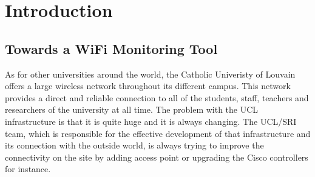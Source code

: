
\chapter{Introduction} %

\label{Chapter1} %




\section{Towards a WiFi Monitoring Tool}
As for other universities around the world, the Catholic Univeristy of Louvain offers a large wireless network throughout its different campus. This network provides a direct and reliable connection to all of the students, staff, teachers and researchers of the university at all time. The problem with the UCL infrastructure is that it is quite huge and it is always changing. The UCL/SRI team, which is responsible for the effective development of that infrastructure and its connection with the outside world, is always trying to improve the connectivity on the site by adding access point or upgrading the Cisco controllers for instance.\\

